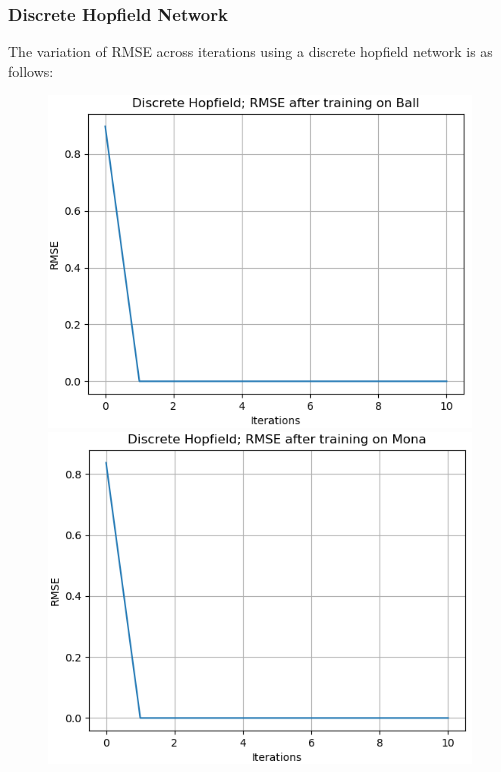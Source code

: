\documentclass[12pt,a4paper]{article}
\begin{document}
\subsubsection{Discrete Hopfield Network}
The variation of RMSE across iterations using a discrete hopfield network is as follows:
\begin{figure}[H]
\centering
\includegraphics[scale=0.45]{images/dhn_ball.png}
\includegraphics[scale=0.45]{images/dhn_mona.png}

\end{figure}
\end{document}
